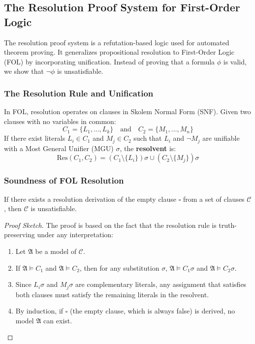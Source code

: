 \documentclass{article}
\newtheorem{theorem}{Theorem}[section]
\let\oldtheorem\theorem
\let\endoldtheorem\endtheorem
\renewenvironment{theorem}
  {\begin{tcolorbox}[
      colback=yellow!6,
      colframe=yellow!60!black,
      boxrule=0.6pt,
      arc=2pt,
      left=6pt,right=6pt,top=4pt,bottom=4pt,
      parbox=false
    ]\oldtheorem}
  {\endoldtheorem\end{tcolorbox}}
\begin{document}
\subsection{The Resolution Proof System for First-Order Logic}The resolution proof system is a refutation-based logic used for automated theorem proving. It generalizes propositional resolution to First-Order Logic (FOL) by incorporating unification. Instead of proving that a formula $\phi$ is valid, we show that $\neg \phi$ is unsatisfiable.\subsubsection{The Resolution Rule and Unification}In FOL, resolution operates on clauses in Skolem Normal Form (SNF). Given two clauses with no variables in common:$$ C_1 = \{L_1, \dots, L_k\} \quad \text{and} \quad C_2 = \{M_1, \dots, M_n\} $$If there exist literals $L_i \in C_1$ and $M_j \in C_2$ such that $L_i$ and $\neg M_j$ are unifiable with a Most General Unifier (MGU) $\sigma$, the \textbf{resolvent} is:$$ \text{Res}(C_1, C_2) = (C_1 \setminus \{L_i\})\sigma \cup (C_2 \setminus \{M_j\})\sigma $$\subsubsection{Soundness of FOL Resolution}\begin{theorem}[Soundness]If there exists a resolution derivation of the empty clause $\square$ from a set of clauses $\mathcal{C}$, then $\mathcal{C}$ is unsatisfiable.\end{theorem}\begin{proof}[Proof Sketch]
The proof is based on the fact that the resolution rule is truth-preserving under any interpretation:
\begin{enumerate}
\item Let $\mathfrak{A}$ be a model of $\mathcal{C}$.
\item If $\mathfrak{A} \models C_1$ and $\mathfrak{A} \models C_2$, then for any substitution $\sigma$, $\mathfrak{A} \models C_1\sigma$ and $\mathfrak{A} \models C_2\sigma$.
\item Since $L_i\sigma$ and $M_j\sigma$ are complementary literals, any assignment that satisfies both clauses must satisfy the remaining literals in the resolvent.
\item By induction, if $\square$ (the empty clause, which is always false) is derived, no model $\mathfrak{A}$ can exist.
\end{enumerate}

\end{proof}
\end{document}
